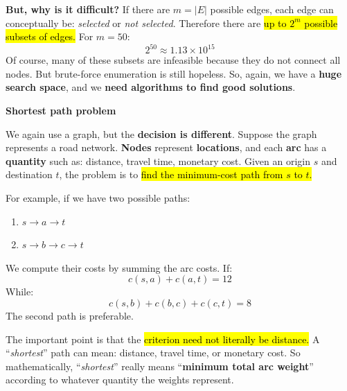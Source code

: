 \highspace
\textcolor{Red2}{ \textbf{But, why is it difficult?}} If there are $m=|E|$ possible edges, each edge can conceptually be: \emph{selected} or \emph{not selected}. Therefore there are \hl{up to $2^m$ possible subsets of edges.} For $m=50$:
\begin{equation*}
    2^{50}\approx 1.13\times 10^{15}
\end{equation*}
Of course, many of these subsets are infeasible because they do not connect all nodes. But brute-force enumeration is still hopeless. So, again, we have a \textbf{huge search space}, and we \textbf{need algorithms to find good solutions}.

\highspace
\begin{flushleft}
    \textcolor{Red2}{ \textbf{Shortest path problem}}
\end{flushleft}
We again use a graph, but the \textbf{decision is different}. Suppose the graph represents a road network. \textbf{Nodes} represent \textbf{locations}, and each \textbf{arc} has a \textbf{quantity} such as: distance, travel time, monetary cost. Given an origin $s$ and destination $t$, the problem is to \hl{find the minimum-cost path from $s$ to $t$.}

\highspace
For example, if we have two possible paths:
\begin{enumerate}
    \item $s\to a\to t$
    \item $s\to b\to c\to t$
\end{enumerate}
We compute their costs by summing the arc costs. If:
\begin{equation*}
    c(s,a)+c(a,t)=12
\end{equation*}
While:
\begin{equation*}
    c(s,b)+c(b,c)+c(c,t)=8
\end{equation*}
The second path is preferable.

\highspace
The important point is that the \hl{criterion need not literally be distance.} A ``\emph{shortest}'' path can mean: distance, travel time, or monetary cost. So mathematically, ``\emph{shortest}'' really means ``\textbf{minimum total arc weight}'' according to whatever quantity the weights represent.

